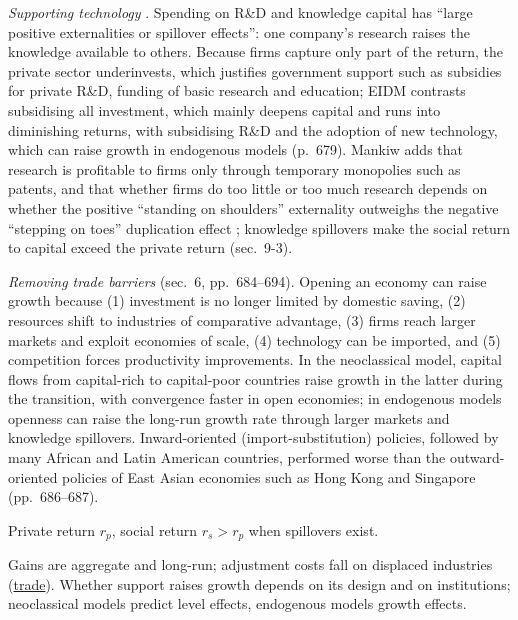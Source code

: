 \begin{qfdefinition}\label{def:growth-policies-technology-trade}
 \emph{Supporting technology} \citep[chap.~11, sec.~5.3, pp.~677--680]{economics-investment-decision-makers-2013}. Spending on R\&D and knowledge capital has ``large positive externalities or spillover effects'': one company's research raises the knowledge available to others. Because firms capture only part of the return, the private sector underinvests, which justifies government support such as subsidies for private R\&D, funding of basic research and education; EIDM contrasts subsidising all investment, which mainly deepens capital and runs into diminishing returns, with subsidising R\&D and the adoption of new technology, which can raise growth in endogenous models (p.~679). Mankiw adds that research is profitable to firms only through temporary monopolies such as patents, and that whether firms do too little or too much research depends on whether the positive ``standing on shoulders'' externality outweighs the negative ``stepping on toes'' duplication effect \citep[chap.~9, sec.~9-4]{macroeconomics-2019}; knowledge spillovers make the social return to capital exceed the private return (sec.~9-3).

\emph{Removing trade barriers} (sec.~6, pp.~684--694). Opening an economy can raise growth because (1) investment is no longer limited by domestic saving, (2) resources shift to industries of comparative advantage, (3) firms reach larger markets and exploit economies of scale, (4) technology can be imported, and (5) competition forces productivity improvements. In the neoclassical model, capital flows from capital-rich to capital-poor countries raise growth in the latter during the transition, with convergence faster in open economies; in endogenous models openness can raise the long-run growth rate through larger markets and knowledge spillovers. Inward-oriented (import-substitution) policies, followed by many African and Latin American countries, performed worse than the outward-oriented policies of East Asian economies such as Hong Kong and Singapore (pp.~686--687).

 Private return $r_p$, social return $r_s>r_p$ when spillovers exist.

 Gains are aggregate and long-run; adjustment costs fall on displaced industries (\hyperref[meth:trade-benefits-restrictions-blocs]{trade}). Whether support raises growth depends on its design and on institutions; neoclassical models predict level effects, endogenous models growth effects.


\end{qfdefinition}
